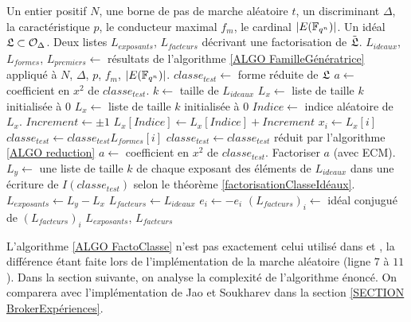 \begin{algorithm}[H]
	\caption{Recherche d'exposants de la classe d'un idéal}\label{ALGO FactoClasse}
	\begin{algorithmic}[1]
		\Require Un entier positif $N$, une borne de pas de marche aléatoire $t$, un discriminant $\Delta$, la caractéristique $p$, le conducteur maximal $f_{m}$, le cardinal $|E(\mathbb{F}_{q^{n}})|$. Un idéal $\mathfrak{L}\subset\mathcal{O}_{\Delta}$. 
		\Ensure Deux listes $L_{exposants}$, $L_{facteurs}$ décrivant une factorisation de $\tilde{\mathfrak{L}}$.
		\State $L_{ideaux}$, $L_{formes}$, $L_{premiers}\gets$ résultats de l'algorithme \ref{ALGO FamilleGénératrice} appliqué à $N$, $\Delta$, $p$, $f_{m}$, $|E(\mathbb{F}_{q^{n}})|$. 
		\State $classe_{test}\gets$ forme réduite de $\mathfrak{L}$
		\State $a\gets$ coefficient en $x^2$ de $classe_{test}$.
		\State $k\gets$ taille de $L_{ideaux}$
		\State $L_{x}\gets$ liste de taille $k$ initialisée à $0$
		\State $L_{x}\gets$ liste de taille $k$ initialisée à $0$
		\State $Indice\gets$ indice aléatoire de $L_{x}$.
		\State $Increment\gets\pm1$
		\State $L_{x}\left[ Indice\right] \gets L_{x}\left[ Indice\right] + Increment$
		\EndFor
		\State $x_{i}\gets L_{x}[i]$
		\State $classe_{test}\gets classe_{test}L_{formes}[i]$
		\State $classe_{test}\gets classe_{test}$ réduit par l'algorithme \ref{ALGO reduction}
		\EndFor
		\EndFor
		\State $a\gets$ coefficient en $x^2$ de $classe_{test}$.
		\State Factoriser $a$ (avec ECM).
		\EndWhile
		\State $L_{y}\gets$ une liste de taille $k$ de chaque exposant des éléments de $L_{ideaux}$ dans une écriture de $I(classe_{test})$ selon le théorème \ref{factorisationClasseIdéaux}.
		\State $L_{exposants}\gets L_{y} - L_{x}$
		\State $L_{facteurs}\gets L_{ideaux}$
		\State $e_i\gets-e_i$
		\State $\left( L_{facteurs}\right) _{i} \gets $ idéal conjugué de $\left( L_{facteurs}\right) _{i}$
		\EndIf
		\EndFor
		\State \Return $L_{exposants}$, $L_{facteurs}$
	\end{algorithmic}
\end{algorithm}

\begin{Rem}
	L'algorithme \ref{ALGO FactoClasse} n'est pas exactement celui utilisé dans \cite{BrokerCharlesLauter} et \cite{JaoSoukharev}, la différence étant faite lors de l'implémentation de la marche aléatoire (ligne $7$ à $11$). Dans la section suivante, on analyse la complexité de l'algorithme énoncé. On comparera avec l'implémentation de Jao et Soukharev \cite{JaoSoukharev} dans la section \ref{SECTION BrokerExpériences}.
\end{Rem}


